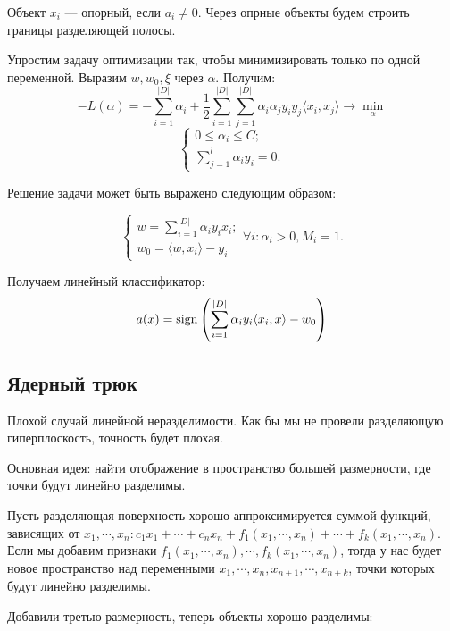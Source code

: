 Объект $x_i$ --- опорный, если $a_i \neq 0$. Через опрные объекты будем строить
границы разделяющей полосы.


Упростим задачу оптимизации так, чтобы минимизировать только по одной
переменной. Выразим $w, w_0, \xi$ через $\alpha$. Получим:
\[
    -L(\alpha) = - \sum_{i=1}^{|D|} \alpha_i + \frac{1}{2} \sum_{i=1}^{|D|}
    \sum_{j=1}^{|D|} \alpha_i \alpha_j y_i y_j \langle x_i, x_j \rangle \to
    \min_\alpha
\]
\[
    \begin{cases}
        0 \leq \alpha_i \leq C;
        \\
        \sum_{j=1}^l \alpha_i y_i = 0.
    \end{cases}
\]

Решение задачи может быть выражено следующим образом:

\[
    \begin{cases}
        w = \sum^{|D|}_{i=1} \alpha_i y_i x_i;
        \\
        w_0 = \langle w, x_i \rangle - y_i
    \end{cases}
    \forall i : \alpha_i > 0, M_i = 1.
\]

Получаем линейный классификатор:
\[
    a(x) = \operatorname{sign} \left( \sum^{|D|}_{i=1} \alpha_i y_i \langle x_i, x \rangle -
    w_0 \right)
\]

\subsection{Ядерный трюк}

Плохой случай линейной неразделимости. Как бы мы не провели разделяющую
гиперплоскость, точность будет плохая.


Основная идея: найти отображение в пространство большей размерности, где точки
будут линейно разделимы.

Пусть разделяющая поверхность хорошо аппроксимируется суммой функций, зависящих
от $x_1, \cdots, x_n : c_1 x_1 + \cdots + c_n x_n + f_1(x_1, \cdots, x_n) +
\cdots + f_k(x_1, \cdots, x_n)$. Если мы добавим признаки $f_1(x_1, \cdots,
x_n), \cdots, f_k(x_1, \cdots, x_n)$, тогда у нас будет новое пространство над
переменными $x_1, \cdots, x_n, x_{n+1}, \cdots, x_{n+k}$, точки которых будут
линейно разделимы.

Добавили третью размерность, теперь объекты хорошо разделимы:


